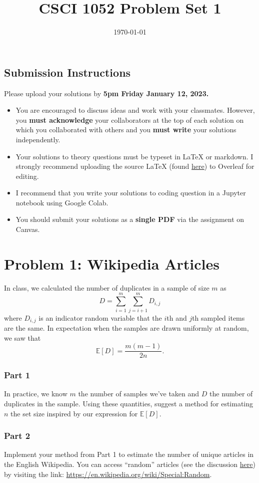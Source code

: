 \documentclass{article}
\title{CSCI 1052 Problem Set 1}
\author{} %
\date{\today}
\begin{document}
\maketitle

\subsection*{Submission Instructions}

Please upload your solutions by
\textbf{5pm Friday January 12, 2023.}
\begin{itemize}
\item You are encouraged to discuss ideas
and work with your classmates. However, you
\textbf{must acknowledge} your collaborators
at the top of each solution on which
you collaborated with others 
and you \textbf{must write} your solutions
independently.
\item Your solutions to theory questions must
be typeset in LaTeX or markdown.
I strongly recommend uploading the source LaTeX (found 
\href{https://www.rtealwitter.com/rads2024/files/ps1.tex}{here})
to Overleaf for editing.
\item I recommend that you write your solutions to coding question in a Jupyter notebook using Google Colab.
\item You should submit your solutions as a \textbf{single PDF} via the assignment on Canvas.
\end{itemize}

\newpage \section*{Problem 1: Wikipedia Articles}
In class, we calculated the number of duplicates in a sample of size $m$ as
$$
D = \sum_{i=1}^m \sum_{j=i+1}^m D_{i,j}
$$
where $D_{i,j}$ is an indicator random variable that the $i$th and $j$th sampled items are the same.
In expectation when the samples are drawn uniformly at random, we saw that
$$
\mathbb{E}[D] = \frac{m (m-1)}{2 n}.
$$

\subsubsection*{Part 1} 
In practice, we know $m$ the number of samples we've taken and $D$ the number of duplicates in the sample.
Using these quantities, suggest a method for estimating $n$ the set size inspired by our expression for $\mathbb{E}[D]$.

\subsubsection*{Part 2}
Implement your method from Part 1 to estimate the number of unique articles in the English Wikipedia.
You can access ``random'' articles (see the discussion \href{https://en.wikipedia.org/wiki/Wikipedia:FAQ/Technical#random}{here}) by visiting the link: \url{https://en.wikipedia.org/wiki/Special:Random}.
\end{document}
